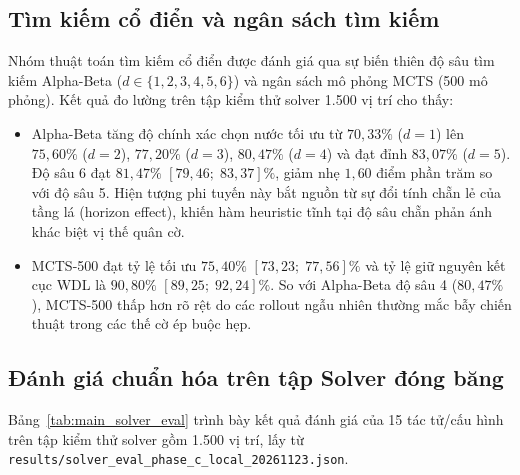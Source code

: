 \documentclass[11pt, a4paper]{article}
\begin{document}
\subsection{Tìm kiếm cổ điển và ngân sách tìm kiếm}
Nhóm thuật toán tìm kiếm cổ điển được đánh giá qua sự biến thiên độ sâu tìm kiếm Alpha-Beta ($d \in \{1, 2, 3, 4, 5, 6\}$) và ngân sách mô phỏng MCTS (500 mô phỏng). Kết quả đo lường trên tập kiểm thử solver 1.500 vị trí cho thấy:
\begin{itemize}
    \item Alpha-Beta tăng độ chính xác chọn nước tối ưu từ $70{,}33\%$ ($d=1$) lên $75{,}60\%$ ($d=2$), $77{,}20\%$ ($d=3$), $80{,}47\%$ ($d=4$) và đạt đỉnh $83{,}07\%$ ($d=5$). Độ sâu 6 đạt $81{,}47\%$ $[79{,}46;\; 83{,}37]\%$, giảm nhẹ $1{,}60$ điểm phần trăm so với độ sâu 5. Hiện tượng phi tuyến này bắt nguồn từ sự đổi tính chẵn lẻ của tầng lá (horizon effect), khiến hàm heuristic tĩnh tại độ sâu chẵn phản ánh khác biệt vị thế quân cờ.
    \item MCTS-500 đạt tỷ lệ tối ưu $75{,}40\%$ $[73{,}23;\; 77{,}56]\%$ và tỷ lệ giữ nguyên kết cục WDL là $90{,}80\%$ $[89{,}25;\; 92{,}24]\%$. So với Alpha-Beta độ sâu 4 ($80{,}47\%$), MCTS-500 thấp hơn rõ rệt do các rollout ngẫu nhiên thường mắc bẫy chiến thuật trong các thế cờ ép buộc hẹp.
\end{itemize}

\subsection{Đánh giá chuẩn hóa trên tập Solver đóng băng}
Bảng~\ref{tab:main_solver_eval} trình bày kết quả đánh giá của 15 tác tử/cấu hình trên tập kiểm thử solver gồm 1.500 vị trí, lấy từ \texttt{results/solver\_eval\_phase\_c\_local\_20261123.json}.
\end{document}
